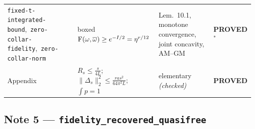 \documentclass[11pt]{article}
\newcommand{\stPR}{{\color{okgreen}\textsf{\scriptsize\bfseries PROVED}}}
\newcommand{\stPMC}{{\color{teal}\textsf{\scriptsize\bfseries PROVED$^\ast$}}}
\newcommand{\CMI}{I}
\begin{document}
{\begin{tabularx}{\textwidth}{L{0.155\textwidth} X L{0.210\textwidth} L{0.098\textwidth}}
\texttt{fixed-\allowbreak t-\allowbreak integrated-\allowbreak bound},\allowbreak\ \texttt{zero-\allowbreak collar-\allowbreak fidelity},\allowbreak\ \texttt{zero-\allowbreak collar-\allowbreak norm} & boxed $\Fid(\omega,\overline\omega)\ge e^{-\CMI/2}=\eta^{r/12}$ & Lem.~10.1, monotone convergence, joint concavity, AM--GM & \stPMC \\
Appendix & $R_s\le\frac s{4L}$; $\|\Delta_s\|_2^2\le\frac{ras^2}{64\pi^2L}$; $\int p=1$ & elementary \emph{(checked)} & \stPR \\
\bottomrule
\end{tabularx}}

\subsection{Note 5 --- \texttt{fidelity\_recovered\_quasifree}}
\end{document}
